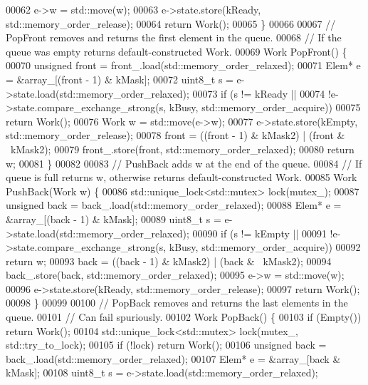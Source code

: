 \begin{DoxyCode}
00062     e->w = std::move(w);
00063     e->state.store(kReady, std::memory\_order\_release);
00064     \textcolor{keywordflow}{return} Work();
00065   \}
00066 
00067   \textcolor{comment}{// PopFront removes and returns the first element in the queue.}
00068   \textcolor{comment}{// If the queue was empty returns default-constructed Work.}
00069   Work PopFront() \{
00070     \textcolor{keywordtype}{unsigned} front = front\_.load(std::memory\_order\_relaxed);
00071     Elem* e = &array\_[(front - 1) & kMask];
00072     uint8\_t s = e->state.load(std::memory\_order\_relaxed);
00073     \textcolor{keywordflow}{if} (s != kReady ||
00074         !e->state.compare\_exchange\_strong(s, kBusy, std::memory\_order\_acquire))
00075       \textcolor{keywordflow}{return} Work();
00076     Work w = std::move(e->w);
00077     e->state.store(kEmpty, std::memory\_order\_release);
00078     front = ((front - 1) & kMask2) | (front & ~kMask2);
00079     front\_.store(front, std::memory\_order\_relaxed);
00080     \textcolor{keywordflow}{return} w;
00081   \}
00082 
00083   \textcolor{comment}{// PushBack adds w at the end of the queue.}
00084   \textcolor{comment}{// If queue is full returns w, otherwise returns default-constructed Work.}
00085   Work PushBack(Work w) \{
00086     std::unique\_lock<std::mutex> lock(mutex\_);
00087     \textcolor{keywordtype}{unsigned} back = back\_.load(std::memory\_order\_relaxed);
00088     Elem* e = &array\_[(back - 1) & kMask];
00089     uint8\_t s = e->state.load(std::memory\_order\_relaxed);
00090     \textcolor{keywordflow}{if} (s != kEmpty ||
00091         !e->state.compare\_exchange\_strong(s, kBusy, std::memory\_order\_acquire))
00092       \textcolor{keywordflow}{return} w;
00093     back = ((back - 1) & kMask2) | (back & ~kMask2);
00094     back\_.store(back, std::memory\_order\_relaxed);
00095     e->w = std::move(w);
00096     e->state.store(kReady, std::memory\_order\_release);
00097     \textcolor{keywordflow}{return} Work();
00098   \}
00099 
00100   \textcolor{comment}{// PopBack removes and returns the last elements in the queue.}
00101   \textcolor{comment}{// Can fail spuriously.}
00102   Work PopBack() \{
00103     \textcolor{keywordflow}{if} (Empty()) \textcolor{keywordflow}{return} Work();
00104     std::unique\_lock<std::mutex> lock(mutex\_, std::try\_to\_lock);
00105     \textcolor{keywordflow}{if} (!lock) \textcolor{keywordflow}{return} Work();
00106     \textcolor{keywordtype}{unsigned} back = back\_.load(std::memory\_order\_relaxed);
00107     Elem* e = &array\_[back & kMask];
00108     uint8\_t s = e->state.load(std::memory\_order\_relaxed);

\end{DoxyCode}
